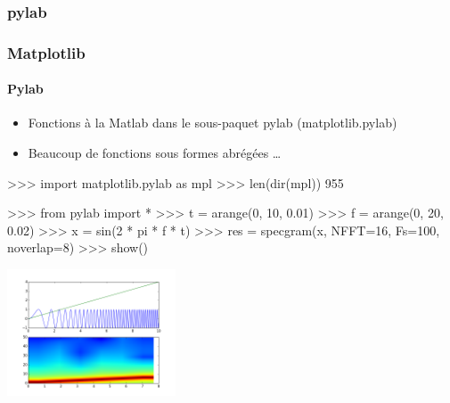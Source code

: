 \subsubsection{pylab}
\begin{frame}[fragile]
\frametitle{Matplotlib}
\framesubtitle{Pylab}
\begin{itemize}
 \item Fonctions à la Matlab dans le sous-paquet pylab (matplotlib.pylab)
 \item Beaucoup de fonctions sous formes abrégées \dots
\end{itemize}
\begin{minipage}[c]{5cm}
\begin{pythonConsole}
>>> import matplotlib.pylab as mpl
>>> len(dir(mpl))
955

>>> from pylab import *
>>> t = arange(0, 10, 0.01)
>>> f = arange(0, 20, 0.02)
>>> x = sin(2 * pi * f * t)
>>> res = specgram(x, NFFT=16, Fs=100, noverlap=8)
>>> show()
\end{pythonConsole}
\end{minipage}
\begin{minipage}[c]{5cm}
 \includegraphics[width=5cm]{./fig/specgram.png}
\end{minipage}
\end{frame}
